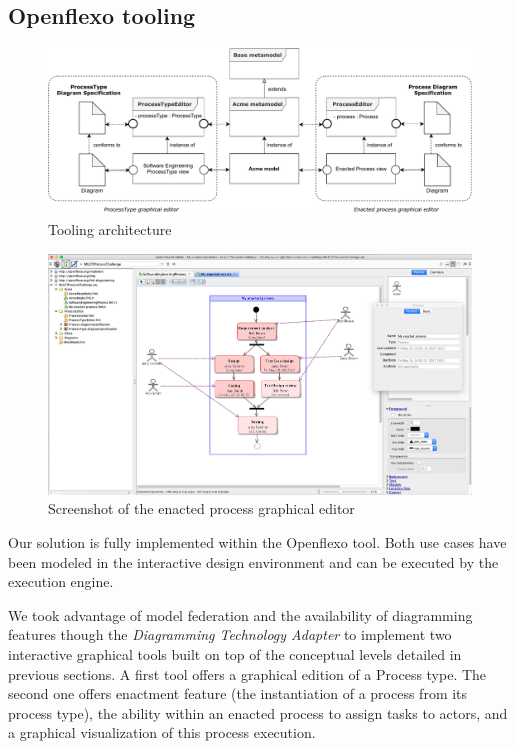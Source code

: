 \subsection{Openflexo tooling}
\label{subsec:tooling}

\begin{figure}
 \centering
     \includegraphics[width=0.9 \textwidth]{Figures/ToolingArchitecture.pdf}
     \caption{Tooling architecture}
    \label{fig:ToolingArchitecture}
\end{figure}

\begin{figure}
 \centering
     \includegraphics[width=\textwidth]{Figures/ScreenshotEnactedProcessEditor.png}
     \caption{Screenshot of the enacted process graphical editor}
    \label{fig:ScreenshotEnactedProcessEditor}
\end{figure}

Our solution is fully implemented within the Openflexo tool. Both use cases have been modeled in the interactive design environment and can be executed by the \FML execution engine.


We took advantage of model federation and the availability of diagramming features though the \textit{Diagramming Technology Adapter} to implement two interactive graphical tools built on top of the conceptual levels detailed in previous sections. A first tool offers a graphical edition of a Process type. The second one offers enactment feature (the instantiation of a process from its process type), the ability within an enacted process to assign tasks to actors, and a graphical visualization of this process execution.


